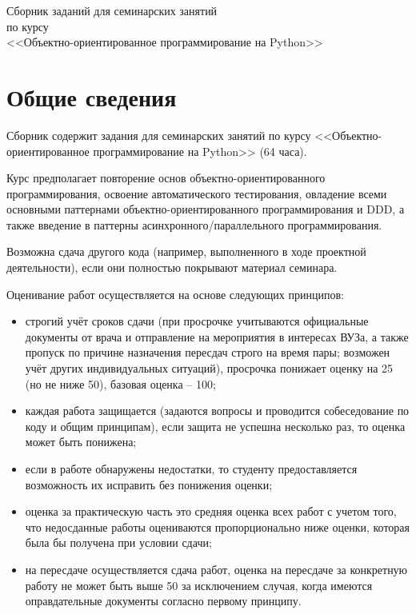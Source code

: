 \documentclass{article}
\begin{document}
{
	\thispagestyle{empty}
	\vspace*{\fill}
	\centering 

	\Large Сборник заданий для семинарских занятий \\
	по курсу \\
	<<Объектно-ориентированное программирование на Python>>\\
	\large
	\vspace{40pt}
	\vspace*{\fill}
	\newpage
}

\tableofcontents
\newpage
\section{Общие сведения}

Сборник содержит задания для семинарских занятий 
по курсу <<Объектно-ориентированное программирование на Python>> 
(64 часа).

Курс предполагает повторение основ объектно-ориентированного программирования, 
освоение автоматического тестирования, овладение всеми основными паттернами 
объектно-ориентированного программирования и DDD, а также введение в паттерны 
асинхронного/параллельного программирования.

Возможна сдача другого кода (например, выполненного в ходе
проектной деятельности), если они полностью покрывают материал семинара.

Оценивание работ осуществляется на основе следующих принципов:

\begin{itemize}
    \item строгий учёт сроков сдачи (при просрочке учитываются официальные документы 
    от врача и отправление на мероприятия в интересах ВУЗа, а также пропуск по причине
    назначения пересдач строго на время пары; возможен учёт других индивидуальных
    ситуаций), просрочка понижает оценку на 25 (но не 
    ниже 50), базовая оценка -- 100;
    \item каждая работа защищается (задаются вопросы и проводится собеседование по коду 
    и общим принципам), если защита не успешна несколько раз, то 
    оценка может быть понижена;
    \item если в работе обнаружены недостатки, то студенту предоставляется возможность
    их исправить без понижения оценки;
    \item оценка за практическую часть это средняя оценка всех работ с учетом того, что 
    недосданные работы оцениваются пропорционально ниже оценки, которая была бы получена
    при условии сдачи;
    \item на пересдаче осуществляется сдача работ, оценка на пересдаче 
    за конкретную работу не может быть выше 50 за исключением случая, 
    когда имеются оправдательные документы согласно первому принципу.
\end{itemize}
\end{document}
